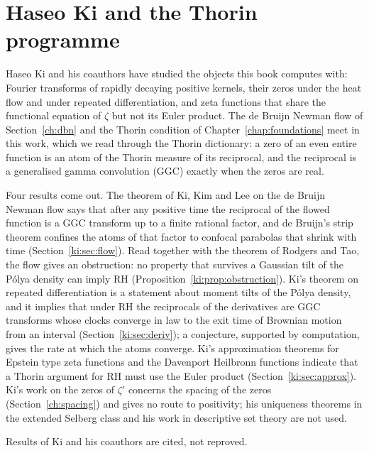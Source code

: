\chapter{Haseo Ki and the Thorin programme}\label{chap:ki}

Haseo Ki and his coauthors have studied the objects this book computes with: Fourier transforms of rapidly decaying positive kernels, their zeros under the heat flow and under repeated differentiation, and zeta functions that share the functional equation of $\zeta$ but not its Euler product. The de Bruijn Newman flow of Section~\ref{ch:dbn} and the Thorin condition of Chapter~\ref{chap:foundations} meet in this work, which we read through the Thorin dictionary: a zero of an even entire function is an atom of the Thorin measure of its reciprocal, and the reciprocal is a generalised gamma convolution (GGC) exactly when the zeros are real.

Four results come out. The theorem of Ki, Kim and Lee on the de Bruijn Newman flow says that after any positive time the reciprocal of the flowed function is a GGC transform up to a finite rational factor, and de Bruijn's strip theorem confines the atoms of that factor to confocal parabolas that shrink with time (Section~\ref{ki:sec:flow}). Read together with the theorem of Rodgers and Tao, the flow gives an obstruction: no property that survives a Gaussian tilt of the P\'olya density can imply RH (Proposition~\ref{ki:prop:obstruction}). Ki's theorem on repeated differentiation is a statement about moment tilts of the P\'olya density, and it implies that under RH the reciprocals of the derivatives are GGC transforms whose clocks converge in law to the exit time of Brownian motion from an interval (Section~\ref{ki:sec:deriv}); a conjecture, supported by computation, gives the rate at which the atoms converge. Ki's approximation theorems for Epstein type zeta functions and the Davenport Heilbronn functions indicate that a Thorin argument for RH must use the Euler product (Section~\ref{ki:sec:approx}). Ki's work on the zeros of $\zeta'$ concerns the spacing of the zeros (Section~\ref{ch:spacing}) and gives no route to positivity; his uniqueness theorems in the extended Selberg class and his work in descriptive set theory are not used.

Results of Ki and his coauthors are cited, not reproved.
